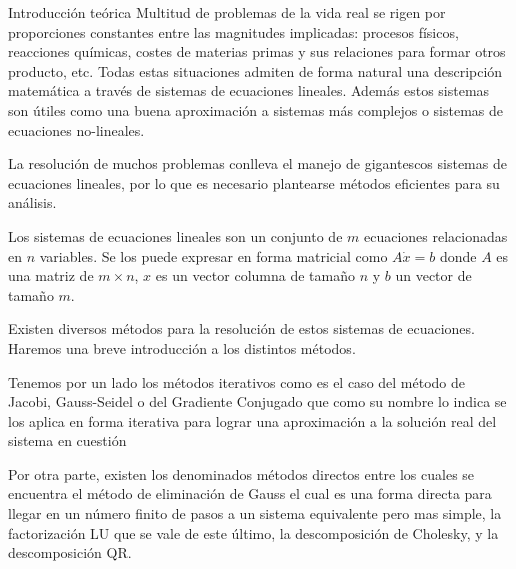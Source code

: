 \begin{section}{Introducción teórica}	
	Multitud de problemas de la vida real se rigen por proporciones constantes entre las magnitudes implicadas: procesos físicos, reacciones químicas, costes de materias primas y sus relaciones para formar otros producto, etc.
	Todas estas situaciones admiten de forma natural una descripción matemática a través de sistemas de ecuaciones lineales.
	Además estos sistemas son útiles como una buena aproximación a sistemas más complejos o sistemas de ecuaciones no-lineales.
	
	La resolución de muchos problemas conlleva el manejo de gigantescos sistemas de ecuaciones lineales, por lo que es necesario plantearse métodos eficientes para su análisis.
	
	Los sistemas de ecuaciones lineales son un conjunto de $m$ ecuaciones relacionadas en $n$ variables. Se los puede expresar en forma matricial como $A \dot x = b$ donde $A$ es una matriz de $m \times n$, $x$ es un vector columna de tamaño $n$ y $b$ un vector de tamaño $m$.
	
	Existen diversos métodos para la resolución de estos sistemas de ecuaciones. Haremos una breve introducción a los distintos métodos.
	
	Tenemos por un lado los métodos iterativos como es el caso del método de Jacobi, Gauss-Seidel o del Gradiente Conjugado que como su nombre lo indica se los aplica en forma iterativa para lograr una aproximación a la solución real del sistema en cuestión
	
	Por otra parte, existen los denominados métodos directos entre los cuales se encuentra el método de eliminación de Gauss el cual es una forma directa para llegar en un número finito de pasos a un sistema equivalente pero mas simple, la factorización LU que se vale de este último, la descomposición de Cholesky, y la descomposición QR.
\end{section}
